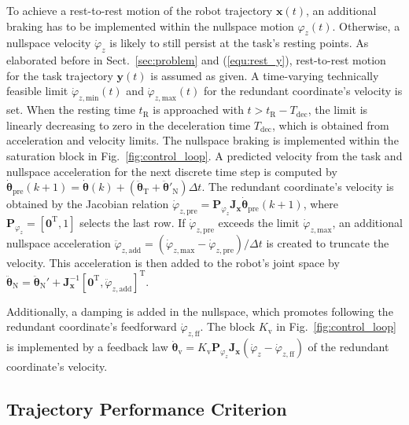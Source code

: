 \documentclass[runningheads]{llncs}
\newcommand{\bm}[1]{\boldsymbol{#1}}
\newcommand{\transp}[0]{{\mathrm{T}}}
\begin{document}
To achieve a rest-to-rest motion of the robot trajectory $\bm{x}(t)$, an additional braking has to be implemented within the nullspace motion $\varphi_z(t)$.
Otherwise, a nullspace velocity $\dot{\varphi}_z$ is likely to still persist at the task's resting points.
As elaborated before in Sect.~\ref{sec:problem} and (\ref{equ:rest_y}), rest-to-rest motion for the task trajectory $\bm{y}(t)$ is assumed as given.
A time-varying technically feasible limit $\dot{\varphi}_{z,\mathrm{min}}(t)$ and $\dot{\varphi}_{z,\mathrm{max}}(t)$ for the redundant coordinate's velocity is set.
When the resting time $t_{\mathrm{R}}$ is approached with $t>t_{\mathrm{R}}-T_{\mathrm{dec}}$, the limit is linearly decreasing to zero in the deceleration time $T_{\mathrm{dec}}$, which is obtained from acceleration and velocity limits.
The nullspace braking is implemented within the saturation block in Fig.~\ref{fig:control_loop}.
A predicted velocity from the task and nullspace acceleration for the next discrete time step is computed by $\dot{\bm{\theta}}_{\mathrm{pre}}(k+1) = \dot{\bm{\theta}}(k) + (\ddot{\bm{\theta}}_{\mathrm{T}}+\ddot{\bm{\theta}}'_{\mathrm{N}}) \Delta t$.
The redundant coordinate's velocity is obtained by the Jacobian relation $\dot{\varphi}_{z,\mathrm{pre}} = \bm{P}_{\varphi_z} \bm{J}_{\bm{x}} \dot{\bm{\theta}}_{\mathrm{pre}}(k+1)$, where $\bm{P}_{\varphi_z}=[\bm{0}^\transp,1]$ selects the last row.
If $\dot{\varphi}_{z,\mathrm{pre}}$ exceeds the limit $\dot{\varphi}_{z,\mathrm{max}}$, an additional nullspace acceleration $\ddot{\varphi}_{z,\mathrm{add}}=(\dot{\varphi}_{z,\mathrm{max}}-\dot{\varphi}_{z,\mathrm{pre}})/\Delta t$ is created to truncate the velocity.
This acceleration is then added to the robot's joint space by $\ddot{\bm{\theta}}_{\mathrm{N}} = \ddot{\bm{\theta}}_{\mathrm{N}}' +  \bm{J}_{\bm{x}}^{-1} [\bm{0}^\transp,\ddot{\varphi}_{z,\mathrm{add}}]^\transp$.

Additionally, a damping is added in the nullspace, which promotes following the redundant coordinate's feedforward $\dot{\varphi}_{z,\mathrm{ff}}$.
The block $K_\mathrm{v}$ in Fig.~\ref{fig:control_loop} is implemented by a feedback law $\dot{\bm{\theta}}_{\mathrm{v}} = K_\mathrm{v} \bm{P}_{\varphi_z} \bm{J}_{\bm{x}} (\dot{\varphi}_{z}-\dot{\varphi}_{z,\mathrm{ff}})$ of the redundant coordinate's velocity.

\subsection{Trajectory Performance Criterion}
\end{document}
